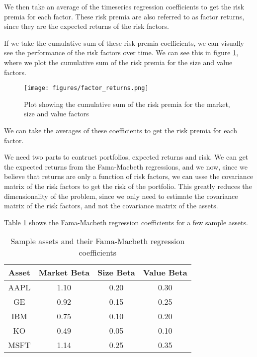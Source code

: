 We then take an average of the timeseries regression coefficients to get the risk premia for each factor.
These risk premia are also referred to as factor returns, since they are the expected returns of the risk factors.

If we take the cumulative sum of these risk premia coefficients, we can visually see the performance of the risk factors over time.
We can see this in figure \ref{fig:factor_returns}, where we plot the cumulative sum of the risk premia for the size and value factors.
\begin{figure}
    \centering
    \texttt{[image: figures/factor\_returns.png]}
    \caption{Plot showing the cumulative sum of the risk premia for the market, size and value factors}
    \label{fig:factor_returns}
\end{figure}

We can take the averages of these coefficients to get the risk premia for each factor.

We need two parts to contruct portfolios, expected returns and risk.
We can get the expected returns from the Fama-Macbeth regressions, and we now, since we 
believe that returns are only a function of risk factors, we can usse the covariance matrix of the risk factors to get the risk of the portfolio.
This greatly reduces the dimensionality of the problem, since we only need to estimate the covariance matrix of the risk factors, and not the covariance matrix of the assets.

Table \ref{tab:sample_assets_fama_macbeth} shows the Fama-Macbeth regression coefficients for a few sample assets.
\begin{table}
    \centering
    \begin{tabular}{|c|c|c|c|}
        \hline
        \textbf{Asset} & \textbf{Market Beta} & \textbf{Size Beta} & \textbf{Value Beta}\\
        \hline
        AAPL & 1.10 & 0.20 & 0.30\\
        GE & 0.92 & 0.15 & 0.25\\
        IBM & 0.75 & 0.10 & 0.20\\
        KO & 0.49 & 0.05 & 0.10\\
        MSFT & 1.14 & 0.25 & 0.35\\
        \hline
    \end{tabular}
    \caption{Sample assets and their Fama-Macbeth regression coefficients}
    \label{tab:sample_assets_fama_macbeth}
\end{table}
